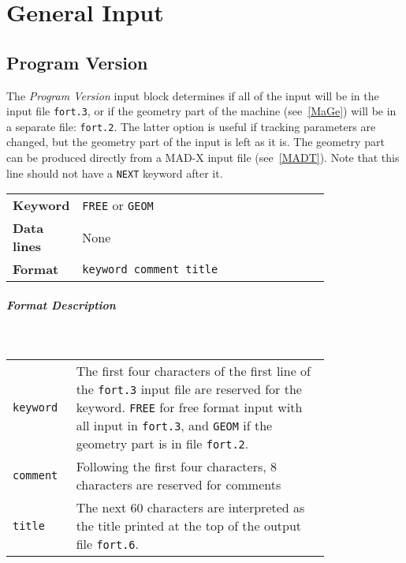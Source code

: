 
\chapter{General Input} \label{GenInp}

\section{Program Version} \label{ProVer}

The \textit{Program Version} input block determines if all of the input will be in the input file \texttt{fort.3}, or if the geometry part of the machine (see~\ref{MaGe}) will be in a separate file: \texttt{fort.2}.
The latter option is useful if tracking parameters are changed, but the geometry part of the input is left as it is.
The geometry part can be produced directly from a MAD-X input file (see~\ref{MADT}).
Note that this line should not have a \texttt{NEXT} keyword after it.

\bigskip
\begin{tabular}{@{}lp{0.8\linewidth}}
    \textbf{Keyword}    & \texttt{FREE} or \texttt{GEOM} \\
    \textbf{Data lines} & None \\
    \textbf{Format}     & \texttt{keyword comment title} \\
\end{tabular}

\paragraph{Format Description}~

\bigskip
\begin{tabular}{@{}lp{0.8\linewidth}}
    \texttt{keyword} & The first four characters of the first line of the \texttt{fort.3} input file are reserved for the keyword. \texttt{FREE} for free format input with all input in \texttt{fort.3}, and \texttt{GEOM} if the geometry part is in file  \texttt{fort.2}. \\
    \texttt{comment} & Following the first four characters, 8 characters are reserved for comments \\
    \texttt{title}   & The next 60 characters are interpreted as the title printed at the top of the output file \texttt{fort.6}.
\end{tabular}

